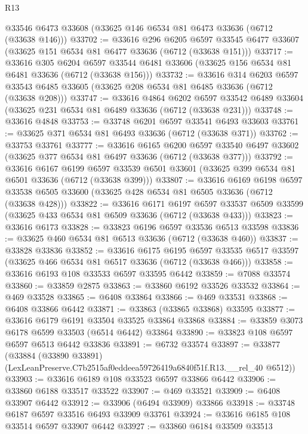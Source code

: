 \begin{lexlean}{R13}
\begin{coremodule}
    @33546
    @6473
    @33608
    (@33625 @146 @6534 @81 @6473 @33636 (@6712 (@33638 @146)))
@33702 := @33616
    @296
    @6205
    @6597
    @33545
    @6477
    @33607
    (@33625 @151 @6534 @81 @6477 @33636 (@6712 (@33638 @151)))
@33717 := @33616
    @305
    @6204
    @6597
    @33544
    @6481
    @33606
    (@33625 @156 @6534 @81 @6481 @33636 (@6712 (@33638 @156)))
@33732 := @33616
    @314
    @6203
    @6597
    @33543
    @6485
    @33605
    (@33625 @208 @6534 @81 @6485 @33636 (@6712 (@33638 @208)))
@33747 := @33616
    @4864
    @6202
    @6597
    @33542
    @6489
    @33604
    (@33625 @231 @6534 @81 @6489 @33636 (@6712 (@33638 @231)))
@33748 := @33616 @4848
@33753 := @33748 @6201 @6597 @33541 @6493 @33603
@33761 := @33625 @371 @6534 @81 @6493 @33636 (@6712 (@33638 @371))
@33762 := @33753 @33761
@33777 := @33616
    @6165
    @6200
    @6597
    @33540
    @6497
    @33602
    (@33625 @377 @6534 @81 @6497 @33636 (@6712 (@33638 @377)))
@33792 := @33616
    @6167
    @6199
    @6597
    @33539
    @6501
    @33601
    (@33625 @399 @6534 @81 @6501 @33636 (@6712 (@33638 @399)))
@33807 := @33616
    @6169
    @6198
    @6597
    @33538
    @6505
    @33600
    (@33625 @428 @6534 @81 @6505 @33636 (@6712 (@33638 @428)))
@33822 := @33616
    @6171
    @6197
    @6597
    @33537
    @6509
    @33599
    (@33625 @433 @6534 @81 @6509 @33636 (@6712 (@33638 @433)))
@33823 := @33616 @6173
@33828 := @33823 @6196 @6597 @33536 @6513 @33598
@33836 := @33625 @460 @6534 @81 @6513 @33636 (@6712 (@33638 @460))
@33837 := @33828 @33836
@33852 := @33616
    @6175
    @6195
    @6597
    @33535
    @6517
    @33597
    (@33625 @466 @6534 @81 @6517 @33636 (@6712 (@33638 @466)))
@33858 := @33616 @6193 @108 @33533 @6597 @33595 @6442
@33859 := @7088 @33574
@33860 := @33859 @2875
@33863 := @33860 @6192 @33526 @33532
@33864 := @469 @33528
@33865 := @6408 @33864
@33866 := @469 @33531
@33868 := @6408 @33866 @6442
@33871 := @33863 (@33865 @33868) @33595
@33877 := @33616 @6179 @6191 @33504 @33525 @33864 @33868
@33884 := @33859 @3073 @6178 @6599 @33503 (@6514 @6442) @33864
@33890 := @33823 @108 @6597 @6597 @6513 @6442 @33836
@33891 := @6732 @33574
@33897 := @33877
    (@33884 (@33890 @33891) (LexLeanPreserve.C7b2515af0eddeea59726419a6840f51f.R13.__rel_40 @6512))
@33903 := @33616 @6189 @108 @33523 @6597 @33866 @6442
@33906 := @33860 @6188 @33517 @33522
@33907 := @469 @33521
@33909 := @6408 @33907 @6442
@33912 := @33906 (@6494 @33909) @33866
@33918 := @33748 @6187 @6597 @33516 @6493 @33909 @33761
@33924 := @33616 @6185 @108 @33514 @6597 @33907 @6442
@33927 := @33860 @6184 @33509 @33513

\end{coremodule}
\end{lexlean}
